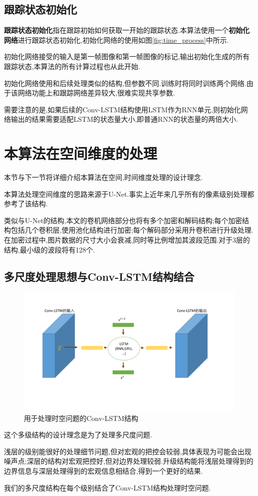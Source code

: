 \subsection{跟踪状态初始化}
\textbf{跟踪状态初始化}指在跟踪初始如何获取一开始的跟踪状态.本算法使用一个\textbf{初始化网络}进行跟踪状态初始化,初始化网络的使用如图\ref{fig:time_process}中所示.
\par
初始化网络接受的输入是第一帧图像和第一帧图像的标记,输出初始化生成的所有跟踪状态,本算法的所有计算过程也从此开始.
\par
初始化网络使用和后续处理类似的结构,但参数不同.训练时将同时训练两个网络.由于该网络功能上和跟踪网络差异较大,很难实现共享参数.
\par
需要注意的是,如果后续的Conv-LSTM结构使用LSTM作为RNN单元,则初始化网络输出的结果需要适配LSTM的状态量大小,即普通RNN的状态量的两倍大小.

\section{本算法在空间维度的处理}
本节与下一节将详细介绍本算法在空间,时间维度处理的设计理念.
\par
本算法处理空间维度的思路来源于U-Net\supercite{ronneberger2015u}.事实上近年来几乎所有的像素级别处理都参考了该结构.
\par
类似与U-Net的结构,本文的卷机网络部分也将有多个加密和解码结构;每个加密结构包括几个卷积层,使用池化结构进行加密;每个解码部分采用升卷积进行升级处理.在加密过程中,图片数据的尺寸大小会衰减,同时等比例增加其波段范围.对于3层的结构,最小级的波段将有128个.

\subsection{多尺度处理思想与Conv-LSTM结构结合} \label{section:multiscale}
\par
\begin{figure}[htbp!]
    \centering
    \includegraphics[width = 1.\textwidth]{chap/img/crnn.pdf}
    \caption{用于处理时空问题的Conv-LSTM结构}
    \label{fig:conv_lstm_arch}
\end{figure}
\par
这个多级结构的设计理念是为了处理多尺度问题.
\par
浅层的级别能很好的处理细节问题,但对宏观的把控会较弱,具体表现为可能会出现噪声点;深层的结构对宏观把控好,但对边界处理较弱.升级结构能将浅层处理得到的边界信息与深层处理得到的宏观信息相结合,得到一个更好的结果.
\par
我们的多尺度结构在每个级别结合了Conv-LSTM结构处理时空问题.

